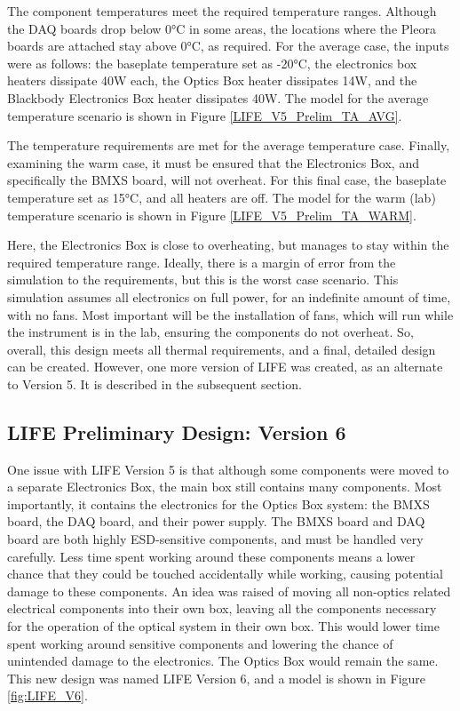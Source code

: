 The component temperatures meet the required temperature ranges. Although the DAQ boards drop below 0°C in some areas, the locations where the Pleora boards are attached stay above 0°C, as required. For the average case, the inputs were as follows: the baseplate temperature set as -20°C, the electronics box heaters dissipate 40W each, the Optics Box heater dissipates 14W, and the Blackbody Electronics Box heater dissipates 40W. The model for the average temperature scenario is shown in Figure \ref{LIFE_V5_Prelim_TA_AVG}.

The temperature requirements are met for the average temperature case. Finally, examining the warm case, it must be ensured that the Electronics Box, and specifically the BMXS board, will not overheat. For this final case, the baseplate temperature set as 15°C, and all heaters are off. The model for the warm (lab) temperature scenario is shown in Figure \ref{LIFE_V5_Prelim_TA_WARM}.

Here, the Electronics Box is close to overheating, but manages to stay within the required temperature range. Ideally, there is a margin of error from the simulation to the requirements, but this is the worst case scenario. This simulation assumes all electronics on full power, for an indefinite amount of time, with no fans. Most important will be the installation of fans, which will run while the instrument is in the lab, ensuring the components do not overheat. So, overall, this design meets all thermal requirements, and a final, detailed design can be created. However, one more version of LIFE was created, as an alternate to Version 5. It is described in the subsequent section.

\subsection{LIFE Preliminary Design: Version 6}
One issue with LIFE Version 5 is that although some components were moved to a separate Electronics Box, the main box still contains many components. Most importantly, it contains the electronics for the Optics Box system: the BMXS board, the DAQ board, and their power supply. The BMXS board and DAQ board are both highly ESD-sensitive components, and must be handled very carefully. Less time spent working around these components means a lower chance that they could be touched accidentally while working, causing potential damage to these components. An idea was raised of moving all non-optics related electrical components into their own box, leaving all the components necessary for the operation of the optical system in their own box. This would lower time spent working around sensitive components and lowering the chance of unintended damage to the electronics. The Optics Box would remain the same. This new design was named LIFE Version 6, and a model is shown in Figure \ref{fig:LIFE_V6}.

